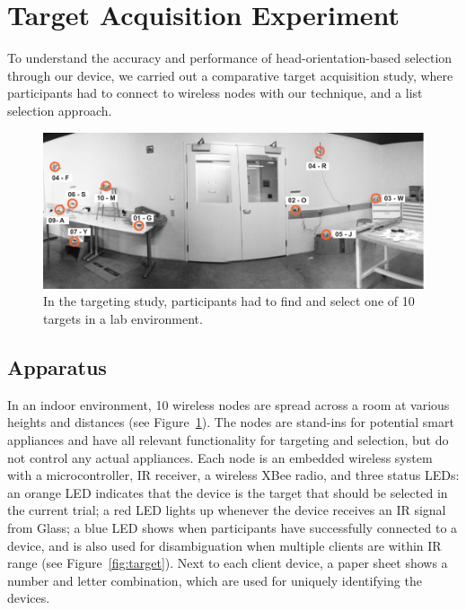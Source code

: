 \section{Target Acquisition Experiment}
To understand the accuracy and performance of head-orientation-based  selection through our device, we carried out a comparative target acquisition study, where participants had to connect to wireless nodes with our technique, and a list selection approach.

\begin{figure}[t]
\centering
\includegraphics[width=1.0\columnwidth]{figures/targeting-study-layout.pdf}
\caption{In the targeting study, participants had to find and select one of 10 targets in a lab environment.}
\label{fig:targeting-study-layout}
\end{figure}

\subsection{Apparatus}
In an indoor environment, 10 wireless nodes are spread across a room at various heights and distances (see Figure~\ref{fig:targeting-study-layout}). The nodes are stand-ins for potential smart appliances and have all relevant functionality for targeting and selection, but do not control any actual appliances. Each node is an embedded wireless system with a microcontroller, IR receiver, a wireless XBee radio, and three status LEDs: an orange LED indicates that the device is the target that should be selected in the current trial; a red LED lights up whenever the device receives an IR signal from Glass; a blue LED shows when participants have successfully connected to a device, and is also used for disambiguation when multiple clients are within IR range (see Figure~\ref{fig:target}). Next to each client device, a paper sheet shows a number and letter combination, which are used for uniquely identifying the devices.

